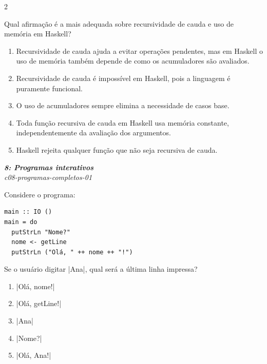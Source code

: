 \documentclass[a4paper,10pt,brazil]{article}
\begin{document}
\begin{multicols}{2}
\begin{flushright}
\end{flushright}
Qual afirmação é a mais adequada sobre recursividade de cauda e uso de memória em Haskell?

\begin{enumerate}
  \item Recursividade de cauda ajuda a evitar operações pendentes, mas em Haskell o uso de memória também depende de como os acumuladores são avaliados.

  \item Recursividade de cauda é impossível em Haskell, pois a linguagem é puramente funcional.

  \item O uso de acumuladores sempre elimina a necessidade de casos base.

  \item Toda função recursiva de cauda em Haskell usa memória constante, independentemente da avaliação dos argumentos.

  \item Haskell rejeita qualquer função que não seja recursiva de cauda.


\end{enumerate}

\begin{flushright}
  \footnotesize
  \textit{\textbf{8: Programas interativos}}\\
  \textit{c08-programas-completos-01}\\

\end{flushright}
Considere o programa:

\begin{verbatim}
main :: IO ()
main = do
  putStrLn "Nome?"
  nome <- getLine
  putStrLn ("Olá, " ++ nome ++ "!")
\end{verbatim}

Se o usuário digitar \haskellinline|Ana|, qual será a última linha impressa?

\begin{enumerate}
  \item \haskellinline|Olá, nome!|

  \item \haskellinline|Olá, getLine!|

  \item \haskellinline|Ana|

  \item \haskellinline|Nome?|

  \item \haskellinline|Olá, Ana!|



\end{enumerate}
\end{multicols}
\end{document}
